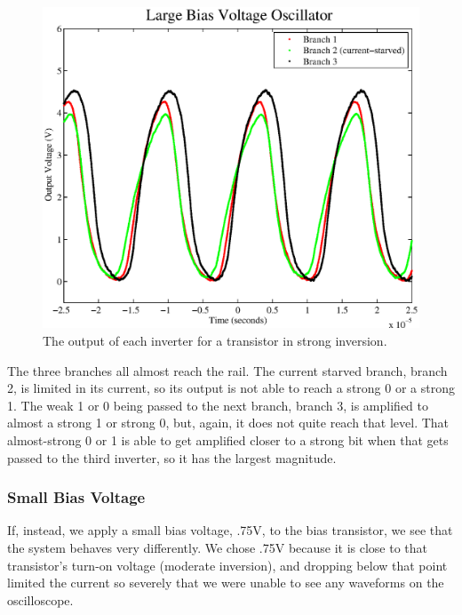 \documentclass{article}
\begin{document}
\begin{figure}[H]
\centering
\includegraphics[scale=.6]{large_bias.eps}
\caption{The output of each inverter for a transistor in strong inversion.}
\label{largeBias}
\end{figure}

The three branches all almost reach the rail.  The current starved branch, branch 2, is limited in its current, so its output is not able to reach a strong 0 or a strong 1.  The weak 1 or 0 being passed to the next branch, branch 3, is amplified to almost a strong 1 or strong 0, but, again, it does not quite reach that level.  That almost-strong 0 or 1 is able to get amplified closer to a strong bit when that gets passed to the third inverter, so it has the largest magnitude.

\subsubsection*{Small Bias Voltage}

If, instead, we apply a small bias voltage, .75V, to the bias transistor, we see that the system behaves very differently.  We chose .75V because it is close to that transistor's turn-on voltage (moderate inversion), and dropping below that point limited the current so severely that we were unable to see any waveforms on the oscilloscope.
\end{document}
